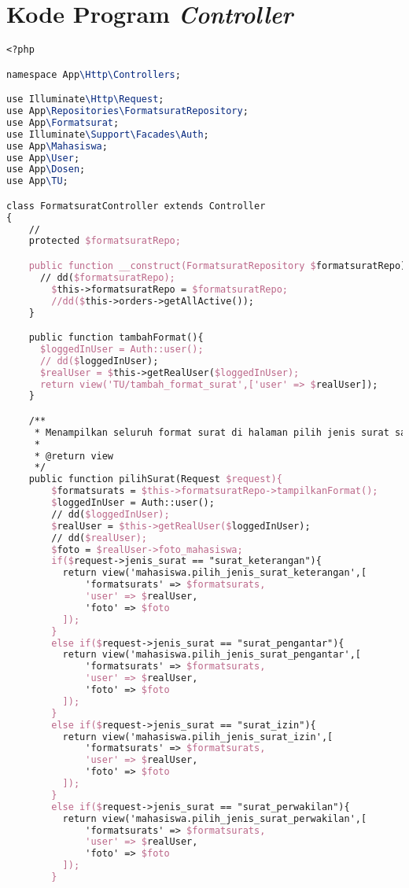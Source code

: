 \chapter{Kode Program \textit{Controller}}
\label{lamp:B}


\begin{lstlisting}[language=tex,basicstyle=\tiny,caption=FormatsuratController.php]
<?php

namespace App\Http\Controllers;

use Illuminate\Http\Request;
use App\Repositories\FormatsuratRepository;
use App\Formatsurat;
use Illuminate\Support\Facades\Auth;
use App\Mahasiswa;
use App\User;
use App\Dosen;
use App\TU;

class FormatsuratController extends Controller
{
    //
    protected $formatsuratRepo;

    public function __construct(FormatsuratRepository $formatsuratRepo){
      // dd($formatsuratRepo);
        $this->formatsuratRepo = $formatsuratRepo;
        //dd($this->orders->getAllActive());
    }

    public function tambahFormat(){
      $loggedInUser = Auth::user();
      // dd($loggedInUser);
      $realUser = $this->getRealUser($loggedInUser);
      return view('TU/tambah_format_surat',['user' => $realUser]);
    }

    /**
	 * Menampilkan seluruh format surat di halaman pilih jenis surat saat mahasiswa hendak memilih jenis surat
	 *
	 * @return view
	 */
	public function pilihSurat(Request $request){
        $formatsurats = $this->formatsuratRepo->tampilkanFormat();
        $loggedInUser = Auth::user();
        // dd($loggedInUser);
        $realUser = $this->getRealUser($loggedInUser);
        // dd($realUser);
        $foto = $realUser->foto_mahasiswa;
        if($request->jenis_surat == "surat_keterangan"){
          return view('mahasiswa.pilih_jenis_surat_keterangan',[
              'formatsurats' => $formatsurats,
              'user' => $realUser,
              'foto' => $foto
          ]);
        }
        else if($request->jenis_surat == "surat_pengantar"){
          return view('mahasiswa.pilih_jenis_surat_pengantar',[
              'formatsurats' => $formatsurats,
              'user' => $realUser,
              'foto' => $foto
          ]);
        }
        else if($request->jenis_surat == "surat_izin"){
          return view('mahasiswa.pilih_jenis_surat_izin',[
              'formatsurats' => $formatsurats,
              'user' => $realUser,
              'foto' => $foto
          ]);
        }
        else if($request->jenis_surat == "surat_perwakilan"){
          return view('mahasiswa.pilih_jenis_surat_perwakilan',[
              'formatsurats' => $formatsurats,
              'user' => $realUser,
              'foto' => $foto
          ]);
        }


\end{lstlisting}
